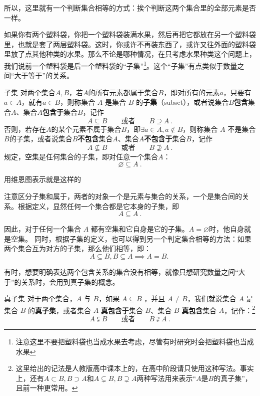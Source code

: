 所以，这里就有一个判断集合相等的方式：挨个判断这两个集合里的全部元素是否一样。

如果你有两个塑料袋，你把一个塑料袋装满水果，然后再把它都放在另一个塑料袋里，也就是套了两层塑料袋。这时，你或许不再装东西了，或许又往外面的塑料袋里放了点其他种类的水果。那么不论是哪种情况，在只考虑水果种类这个问题上，我们说前一个塑料袋是后一个塑料袋的“子集”\footnote{注意这里不要把塑料袋也当成水果去考虑，尽管有时研究时会把塑料袋也当成水果}。这个“子集”有点类似于数量之间“大于等于”的关系。

\begin{definition}{子集}
对两个集合$A,B$，若$A$的所有元素都属于集合$B$，即对所有的元素$a$，只要有$a\in A$，就有$a\in B$，则称集合 $A$ 是集合 $B$ 的\textbf{子集}（subset），或者说集合$B$\textbf{包含}集合$A$、集合$A$\textbf{包含于}集合$B$，记作
\begin{equation}
A \subseteq B\qquad\text{或者}\qquad B \supseteq A~.
\end{equation}
否则，若存在$A$的某个元素不属于集合$B$，即$\exists a\in A,a\notin B$，则称集合 $A$ 不是集合$B$的子集，或者说集合$B$\textbf{不包含}集合$A$、集合$A$\textbf{不包含于}集合$B$，记作
\begin{equation}
A \nsubseteq B\qquad\text{或者}\qquad B \nsupseteq A~.
\end{equation}
规定，空集是任何集合的子集，即对任意一个集合$A$：
\begin{equation}
\varnothing \subseteq A~.
\end{equation}
\end{definition}

用维恩图表示就是这样的

注意区分子集和属于，两者的对象一个是元素与集合的关系，一个是集合间的关系。根据定义，显然任何一个集合都是它本身的子集，即
\begin{equation}
A \subseteq A~.
\end{equation}

因此，对于任何一个集合 $A$ 都有空集和它自身是它的子集。$A=\varnothing$时，他自身就是空集。
同时，根据子集的定义，也可以得到另一个判定集合相等的方法：如果两个集合互为对方的子集，那么他们相等，即：
\begin{equation}
A\subseteq B,B\subseteq A\implies A=B.~
\end{equation}

有时，想要明确表达两个包含关系的集合没有相等，就像只想研究数量之间“大于”的关系时，会用到真子集的概念。

\begin{definition}{真子集}
对于两个集合，$A$ 与 $B$，如果 $A\subseteq B$ ，并且 $A \ne B$，我们就说集合 $A$ 是集合 $B$ 的\textbf{真子集}，或者集合 $A$ \textbf{真包含于}集合 $B$、集合 $B$ \textbf{真包含}集合 $A$，记作：\footnote{这里给出的记法是人教版高中课本上的，在高中阶段请只使用这种写法。事实上，还有$A\subset B,B\supset A$和$A\subsetneq B,B\supsetneq A$两种写法用来表示“$A$是$B$的真子集”，且前一种更常用。}
\begin{equation}
A \subsetneqq B\qquad\text{或者}\qquad B \supsetneqq A~.
\end{equation}
\end{definition}

